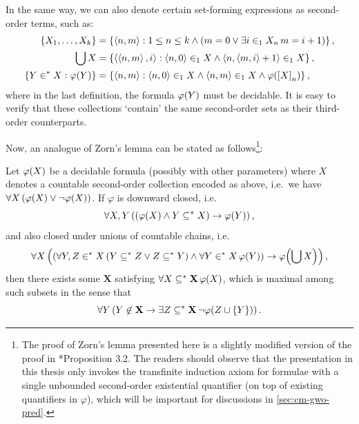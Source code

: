 \documentclass[12pt,openany]{book}
\makeatletter
\newcommand\inds[1]{\index{C@Set theory!#1}}
\theoremstyle{plain}
\theoremstyle{definition}
\newcommand\uppar[1]{{\upshape(}#1{\upshape)}}
\newcommand\tuple[1]{\left\langle #1 \right\rangle}
\newcommand\opA[1]{\mathop{\forall #1}}
\newcommand\opE[1]{\mathop{\exists #1}}
\newcommand\CM{\mathrm{CM}}
\newcommand\GWO{\mathrm{GWO}}
\makeatother
\begin{document}
In the same way, we can also denote certain set-forming expressions as second-order terms, such as:
\begin{align*}
  \left\{X_1, \ldots, X_k\right\}                    & = \left\{\tuple{n, m} : 1 \leq n \leq k \land \left(m = 0 \lor \opE{i \in_1 X_n} m = i + 1\right)\right\},                    \\
  \bigcup X                                          & = \left\{\tuple{\tuple{n, m}, i} : \tuple{n, 0} \in_1 X \land \tuple{n, \tuple{m, i} + 1} \in_1 X\right\},                    \\
  \left\{Y \in^* X : \varphi\mleft(Y\mright)\right\} & = \left\{\tuple{n, m} : \tuple{n, 0} \in_1 X \land \tuple{n, m} \in_1 X \land \varphi\mleft(\left[X\right]_n\mright)\right\},
\end{align*}
where in the last definition, the formula $\varphi\mleft(Y\mright)$ must be decidable. It is easy to verify that these collections `contain' the same second-order sets as their third-order counterparts.

Now, an analogue of Zorn's lemma\inds{Zorn's lemma} can be stated as follows\footnote{\label{ftn:zorn-lemm-proof-sigma}The proof of Zorn's lemma presented here is a slightly modified version of the proof in \cite{wang-sw25-cm}*{Proposition 3.2}. The readers should observe that the presentation in this thesis only invokes the transfinite induction axiom for formulae with a single unbounded second-order existential quantifier (on top of existing quantifiers in $\varphi$), which will be important for discussions in \autoref{sec:cm-gwo-pred}.}:
\begin{proposition}[$\CM + \GWO$]
  \label{prop:cm-gwo-zorn}
  Let $\varphi\mleft(X\mright)$ be a decidable formula \uppar{possibly with other parameters} where $X$ denotes a countable second-order collection encoded as above, i.e.\ we have $\opA{X} \left(\varphi\mleft(X\mright) \lor \neg \varphi\mleft(X\mright)\right)$. If $\varphi$ is downward closed, i.e.
  \[\opA{X, Y} \left(\left(\varphi\mleft(X\mright) \land Y \subseteq^* X\right) \rightarrow \varphi\mleft(Y\mright)\right),\]
  and also closed under unions of countable chains, i.e.
  \[\opA{X} \left(\left(\opA{Y, Z \in^* X} \left(Y \subseteq^* Z \lor Z \subseteq^* Y\right) \land \opA{Y \in^* X} \varphi\mleft(Y\mright)\right) \rightarrow \varphi\mleft(\bigcup X\mright)\right),\]
  then there exists some $\mathbf{X}$ satisfying $\opA{X \subseteq^* \mathbf{X}} \varphi\mleft(X\mright)$, which is maximal among such subsets in the sense that
  \[\opA{Y} \left(Y \not\in \mathbf{X} \rightarrow \opE{Z \subseteq^* \mathbf{X}} \neg \varphi\mleft(Z \cup \left\{Y\right\}\mright)\right).\]
\end{proposition}
\end{document}
